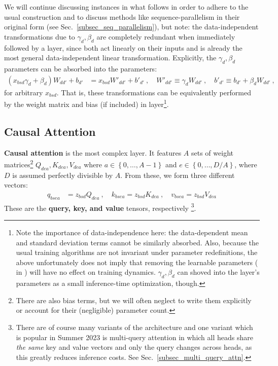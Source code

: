We will continue discussing  instances in what follows in order to adhere to the
usual construction and to discuss methods like sequence-parallelism in their original form (see
Sec.~\ref{subsec_seq_parallelism}), but note: the data-independent 
transformations due to $  \gamma _{ d }, \beta _{ d } $ are completely redundant when immediately
followed by a  layer, since both act linearly on their inputs and 
is already the most general data-independent linear transformation. Explicitly, the  $ \gamma _{ d
}, \beta _{ d } $ parameters can be absorbed into the  parameters:
\begin{align}
	\left (     x _{ bsd } \gamma _{ d } + \beta _{ d } \right )  W _{d d'}    + b _{ d' } & = x _{ bsd }
	W' _{ d d' } + b' _{ d' } \ , \quad W' _{ d d' } \equiv  \gamma _{  d} W _{ d d' } \ , \quad b' _{
	d' } \equiv b _{ d' } + \beta _{ d }W _{ d d' } \ ,
\end{align}
for arbitrary $ x _{ bsd } $. That is, these transformations can be equivalently performed by the
weight matrix and bias (if included) in  layer\footnote{Note the importance of
    data-independence here: the data-dependent mean and standard deviation terms cannot be similarly
    absorbed.  Also, because the usual training algorithms are not invariant under parameter
    redefinitions, the above unfortunately does not imply that removing the learnable
     parameters ( in ) will
have no effect on training dynamics. $ \gamma _{ d }, \beta _{ d } $ can shoved into the
 layer's parameters as a small inference-time optimization, though.}.

\subsection{Causal Attention \label{subsubsec_attn_layer} }

\textbf{Causal attention} is the most complex layer. It features $ A $  sets of weight
matrices\footnote{There are also bias terms, but we will often neglect to write them explicitly or
    account for their (negligible)
	parameter count.}  $ Q  _{ d e a}, K  _{ de a}, V  _{ dea }  $
where $ a \in \left \{ 0, \ldots, A-1 \right \} $ and $ e \in \left \{ 0, \ldots, D/A \right \} $,
where $ D $ is assumed perfectly divisible by $ A $.
From these, we form three different vectors:
\begin{align}
	q _{ bsea } & = z _{ bsd } Q _{ dea } \ , \quad
	k _{ bsea } = z _{ bsd } K _{ dea }  \ , \quad
	v _{ bsea } = z _{ bsd } V _{ dea }
\end{align}
These are the \textbf{query, key, and value} tensors, respectively \footnote{There are of course
	many variants of the architecture and one variant which is popular in Summer 2023 is multi-query
	attention \cite{shazeer2019fast} in which all heads share \textit{the same} key and value vectors
    and only the query changes across heads, as this greatly reduces inference costs. See
Sec.~\ref{subsec_multi_query_attn}.}.

